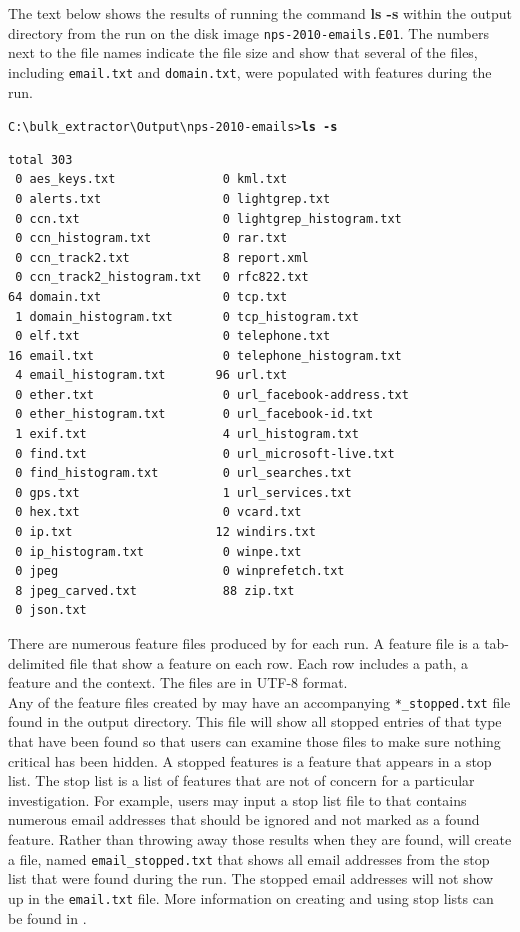 \documentclass[11pt]{article} %
\begin{document}
The text below shows the results of running the command \textbf{ls -s} within the output directory from the \bulk run on the disk image \texttt{nps-2010-emails.E01}. The numbers next to the file names indicate the file size and show that several of the files, including \texttt{email.txt} and \texttt{domain.txt}, were populated with features during the run.

\begingroup
\footnotesize
\texttt{C:\textbackslash bulk\_extractor\textbackslash Output\textbackslash nps-2010-emails\textgreater \textbf{ls -s}}
\endgroup
\begingroup
\footnotesize
\begin{Verbatim}[fontfamily=courier]
total 303
 0 aes_keys.txt               0 kml.txt
 0 alerts.txt                 0 lightgrep.txt
 0 ccn.txt                    0 lightgrep_histogram.txt
 0 ccn_histogram.txt          0 rar.txt
 0 ccn_track2.txt             8 report.xml
 0 ccn_track2_histogram.txt   0 rfc822.txt
64 domain.txt                 0 tcp.txt
 1 domain_histogram.txt       0 tcp_histogram.txt
 0 elf.txt                    0 telephone.txt
16 email.txt                  0 telephone_histogram.txt
 4 email_histogram.txt       96 url.txt
 0 ether.txt                  0 url_facebook-address.txt
 0 ether_histogram.txt        0 url_facebook-id.txt
 1 exif.txt                   4 url_histogram.txt
 0 find.txt                   0 url_microsoft-live.txt
 0 find_histogram.txt         0 url_searches.txt
 0 gps.txt                    1 url_services.txt
 0 hex.txt                    0 vcard.txt
 0 ip.txt                    12 windirs.txt
 0 ip_histogram.txt           0 winpe.txt
 0 jpeg                       0 winprefetch.txt
 8 jpeg_carved.txt            88 zip.txt
 0 json.txt
\end{Verbatim}
\endgroup


There are numerous feature files produced by \bulk for each run. A feature file is a tab-delimited file that show a feature on each row. Each row includes a path, a feature and the context. The files are in UTF-8 format.\\

Any of the feature files created by \bulk may have an accompanying \texttt{*\_stopped.txt} file found in the output directory. This file will show all stopped entries of that type that have been found so that users can examine those files to make sure nothing critical has been hidden. A stopped features is a feature that appears in a stop list. The stop list is a list of features that are not of concern for a particular investigation. For example, users may input a stop list file to \bulk that contains numerous email addresses that should be ignored and not marked as a found feature. Rather than throwing away those results when they are found, \bulk will create a file, named \texttt{email\_stopped.txt} that shows all email addresses from the stop list that were found during the run. The stopped email addresses will not show up in the \texttt{email.txt} file. More information on creating and using stop lists can be found in \textbf{}.\\
\end{document}
